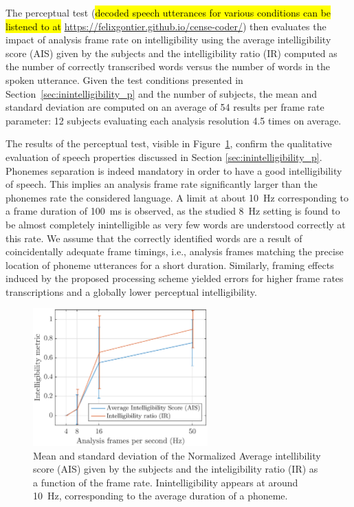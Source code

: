\documentclass[sensors,article,accept,moreauthors,pdftex,10pt,a4paper]{mdpi}
\begin{document}
The perceptual test ({\hl{decoded speech utterances for various conditions can be listened to at} \url{https://felixgontier.github.io/cense-coder/}}) then evaluates the impact of analysis frame rate on intelligibility using the average intelligibility score (AIS) given by the subjects and the intelligibility ratio (IR) computed as the number of correctly transcribed words versus the number of words in the spoken utterance. Given the test conditions presented in Section~\ref{sec:inintelligibility_p} and the number of subjects, the mean and standard deviation are computed on an average of 54 results per frame rate parameter: 12 subjects evaluating each analysis resolution 4.5 times on average.

The results of the perceptual test, visible in Figure~\ref{fig:subj_int}, confirm the qualitative evaluation of speech properties discussed in Section \ref{sec:inintelligibility_p}. Phonemes separation is indeed mandatory in order to have a good intelligibility of speech. This implies an analysis frame rate significantly larger than the phonemes rate the considered language. A limit at about 10~Hz corresponding to a frame duration of 100~ms is observed, as the studied 8~Hz setting is found to be almost completely inintelligible as very few words are understood correctly at this rate. We assume that the correctly identified words are a result of coincidentally adequate frame timings, i.e., analysis frames matching the precise location of phoneme utterances for a short duration. Similarly, framing effects induced by the proposed processing scheme yielded errors for higher frame rates transcriptions and a globally lower perceptual intelligibility.
\vspace{-6pt} 
\begin{figure}[H]
	\centering
		\includegraphics[width=0.6\textwidth]{figures/subj_int.eps}
	\caption{Mean and standard deviation of the Normalized Average intellibility score (AIS) given by the subjects and the inteligibility ratio (IR) as a function of the frame rate. Inintelligibility appears at around 10~Hz, corresponding to the average duration of a phoneme.}
	\label{fig:subj_int}
\end{figure}
\end{document}
